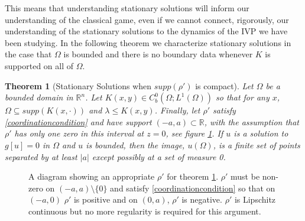 \documentclass[aps,
preprint,
groupedaddress,
showkeys,
amsmath]{revtex4-2}
\newtheorem{theorem}{Theorem}
\begin{document}
    This means that understanding stationary solutions will inform our understanding of the classical game, even if we cannot connect,  rigorously, our understanding of the stationary solutions to the dynamics of the IVP we have been studying. In the following theorem we characterize stationary solutions in the case that $\Omega$ is bounded and there is no boundary data whenever $K$ is supported on all of $\Omega$.

     \begin{theorem}[Stationary Solutions when $supp(\rho')$ is compact]\label{THM:StationarySolution}
        Let $\Omega$ be a bounded domain in $\mathbb{R}^n$. Let $K(x,y)\in C_b^0(\Omega;L^1(\Omega))$ so that for any $x$, $\Omega\subseteq supp(K(x,\cdot))$ and $\lambda \leq K(x,y)$. Finally, let $\rho'$ satisfy \eqref{coordinationcondition} and have support $(-a,a)\subset \mathbb{R}$, with the assumption that $\rho'$ has only one zero in this interval at $z=0$, see figure \ref{fig:rhoprime}. If $u$ is a solution to $g[u]=0$ in $\Omega$ and $u$ is bounded, then the image, $u(\Omega)$, is a finite set of points separated by at least $|a|$ except possibly at a set of measure 0.
    \end{theorem}

    \begin{figure}
        \centering
        \caption{A diagram showing an appropriate $\rho'$ for theorem \ref{THM:StationarySolution}. $\rho'$ must be non-zero on $(-a,a)\setminus\{0\}$ and satisfy \eqref{coordinationcondition} so that on $(-a,0)$ $\rho'$ is positive and on $(0,a)$, $\rho'$ is negative. $\rho'$ is Lipschitz continuous but no more regularity is required for this argument.}
        \label{fig:rhoprime}
    \end{figure}
\end{document}

